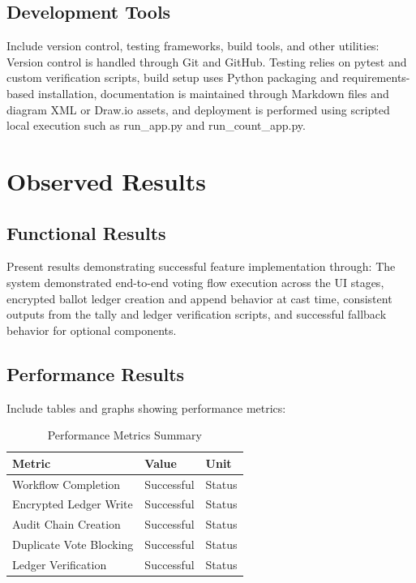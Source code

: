 \subsection{Development Tools}
Include version control, testing frameworks, build tools, and other utilities:
Version control is handled through Git and GitHub. Testing relies on pytest and custom verification scripts, build setup uses Python packaging and requirements-based installation, documentation is maintained through Markdown files and diagram XML or Draw.io assets, and deployment is performed using scripted local execution such as run_app.py and run_count_app.py.

\section{Observed Results}

\subsection{Functional Results}
Present results demonstrating successful feature implementation through:
The system demonstrated end-to-end voting flow execution across the UI stages, encrypted ballot ledger creation and append behavior at cast time, consistent outputs from the tally and ledger verification scripts, and successful fallback behavior for optional components.

\subsection{Performance Results}
Include tables and graphs showing performance metrics:

\begin{table}[htbp]
\centering
\caption{Performance Metrics Summary}
\begin{tabular}{p{}p{}p{}}
\toprule
Metric & Value & Unit \\
\midrule
Workflow Completion & Successful & Status \\
Encrypted Ledger Write & Successful & Status \\
Audit Chain Creation & Successful & Status \\
Duplicate Vote Blocking & Successful & Status \\
Ledger Verification & Successful & Status \\
\bottomrule
\end{tabular}
\end{table}

